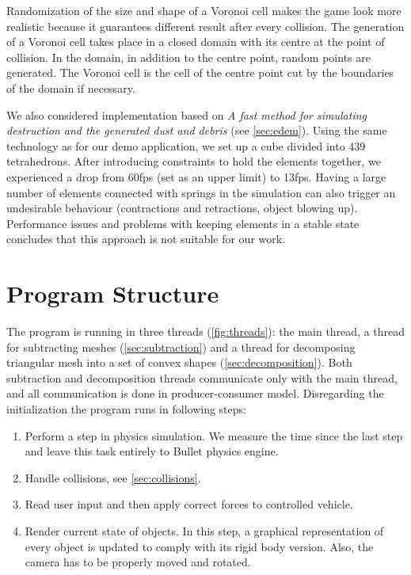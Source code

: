Randomization of the size and shape of a Voronoi cell makes the game look more realistic because it guarantees different result after every collision. The generation of a Voronoi cell takes place in a closed domain with its centre at the point of collision. In the domain, in addition to the centre point, random points are generated. The Voronoi cell is the cell of the centre point cut by the boundaries of the domain if necessary.

We also considered implementation based on \emph{A fast method for simulating destruction and the generated dust and debris} (see \cref{sec:edem}). Using the same technology as for our demo application, we set up a cube divided into 439 tetrahedrons. After introducing constraints to hold the elements together, we experienced a drop from 60fps (set as an upper limit) to 13fps. Having a large number of elements connected with springs in the simulation can also trigger an undesirable behaviour (contractions and retractions, object blowing up). Performance issues and problems with keeping elements in a stable state concludes that this approach is not suitable for our work.


\section{Program Structure}
The program is running in three threads (\cref{fig:threads}): the main thread, a thread for subtracting meshes (\cref{sec:subtraction}) and a thread for decomposing triangular mesh into a set of convex shapes (\cref{sec:decomposition}). Both subtraction and decomposition threads communicate only with the main thread, and all communication is done in producer-consumer model. Disregarding the initialization the program runs in following steps:
\begin{enumerate}
\item Perform a step in physics simulation. We measure the time since the last step and leave this task entirely to Bullet physics engine.
\item Handle collisions, see \cref{sec:collisions}.
\item Read user input and then apply correct forces to controlled vehicle.
\item Render current state of objects. In this step, a graphical representation of every object is updated to comply with its rigid body version. Also, the camera has to be properly moved and rotated.
\end{enumerate}

